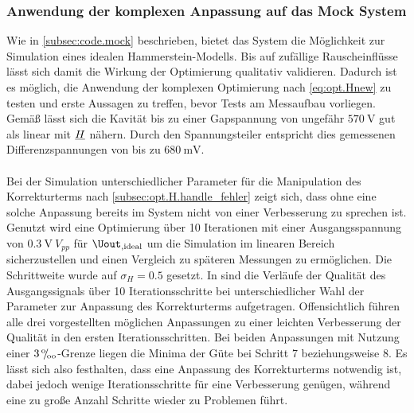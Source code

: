 \documentclass[../Report.tex]{subfiles}
\begin{document}
\subsubsection{Anwendung der komplexen Anpassung auf das Mock System}
\label{subsubsec:opt.H.mock_simulation}

Wie in \ref{subsec:code.mock} beschrieben, bietet das \mock System die Möglichkeit zur Simulation eines idealen Hammerstein-Modells. Bis auf zufällige Rauscheinflüsse lässt sich damit die Wirkung der Optimierung qualitativ validieren.
Dadurch ist es möglich, die Anwendung der komplexen Optimierung nach \eqref{eq:opt.Hnew} zu testen und erste Aussagen zu treffen, bevor Tests am Messaufbau vorliegen.
Gemäß \cite{gross17} lässt sich die Kavität bis zu einer Gapspannung von ungefähr $\SI{570}{\volt}$ gut als linear mit $\underline{H}$ nähern. Durch den Spannungsteiler entspricht dies gemessenen Differenzspannungen von bis zu $\SI{680}{\milli\volt}$.
\\
\\
Bei der Simulation unterschiedlicher Parameter für die Manipulation des Korrekturterms nach \ref{subsec:opt.H.handle_fehler} zeigt sich, dass ohne eine solche Anpassung bereits im \mock System nicht von einer Verbesserung zu sprechen ist.
Genutzt wird eine Optimierung über 10 Iterationen mit einer Ausgangsspannung von $\SI{0.3}{\volt} ~ V_{pp}$ für $\Uout_{, \mathrm{ideal}}$ um die Simulation im linearen Bereich sicherzustellen und einen Vergleich zu späteren Messungen zu ermöglichen. Die Schrittweite wurde auf $\sigma_H = 0.5$ gesetzt.
In  sind die Verläufe der Qualität des Ausgangssignals über 10 Iterationsschritte bei unterschiedlicher Wahl der Parameter zur Anpassung des Korrekturterms aufgetragen. Offensichtlich führen alle drei vorgestellten möglichen Anpassungen zu einer leichten Verbesserung der Qualität in den ersten Iterationsschritten. Bei beiden Anpassungen mit Nutzung einer $3 \, {}^\text{o}\mkern-5mu/\mkern-3mu_\text{oo}$-Grenze liegen die Minima der Güte bei Schritt 7 beziehungsweise 8. 
Es lässt sich also festhalten, dass eine Anpassung des Korrekturterms notwendig ist, dabei jedoch wenige Iterationsschritte für eine Verbesserung genügen, während eine zu große Anzahl Schritte wieder zu Problemen führt. 

 \qualitySimple
{} \qualityThreePerm
{} \qualityAll
{} \qualityRMS
{} \qualityZeroPad
\end{document}
